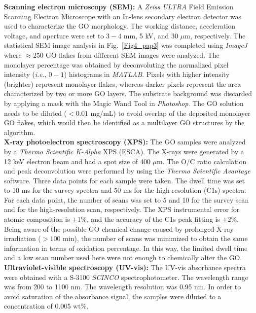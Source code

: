 \textbf{Scanning electron microscopy (SEM):} A \textit{Zeiss ULTRA} Field Emission Scanning Electron Microscope with an In-lens secondary electron detector was used to characterize the GO morphology. The working distance, acceleration voltage, and aperture were set to $3-4$ mm, 5 kV, and 30 $\mu$m, respectively. The statistical SEM image analysis in Fig.~\ref{Fig4_pap3} was completed using \textit{ImageJ} where $\approx250$ GO flakes from different SEM images were analyzed. The monolayer percentage was obtained by deconvoluting the normalized pixel intensity (\textit{i.e.}, $0-1$) histograms in \textit{MATLAB}. Pixels with higher intensity (brighter) represent monolayer flakes, whereas darker pixels represent the area characterized by two or more GO layers. The substrate background was discarded by applying a mask with the Magic Wand Tool in  \textit{Photoshop}. The GO solution needs to be diluted ($<0.01$ mg/mL) to avoid overlap of the deposited monolayer GO flakes, which would then be identified as a multilayer GO structures by the algorithm.\\
\textbf{X-ray photoelectron spectroscopy (XPS):} The GO samples were analyzed by a \textit{Thermo Scientific K-Alpha} XPS (ESCA). The X-rays were generated by a 12 keV electron beam and had a spot size of 400 $\mu$m. The O/C ratio calculation and peak deconvolution were performed by using the \textit{Thermo Scientific Avantage} software. Three data points for each sample were taken. The dwell time was set to 10 ms for the survey spectra and 50 ms for the high-resolution (C1s) spectra. For each data point, the number of scans was set to 5 and 10 for the survey scan and for the high-resolution scan, respectively. The XPS instrumental error for atomic composition is $\pm$1\%, and the accuracy of the C1s peak fitting is $\pm$2\%. Being aware of the possible GO chemical change caused by prolonged X-ray irradiation ($>100$ min),\cite{rogala2016observer} the number of scans was minimized to obtain the same information in terms of oxidation percentage. In this way, the limited dwell time and a low scan number used here were not enough to chemically alter the GO.\\
\textbf{Ultraviolet-visible spectroscopy (UV-vis):} The UV-vis absorbance spectra were obtained with a S-3100 \textit{SCINCO} spectrophotometer. The wavelength range was from 200 to 1100 nm. The wavelength resolution was 0.95 nm. In order to avoid saturation of the absorbance signal, the samples were diluted to a concentration of 0.005 wt\%.\\
